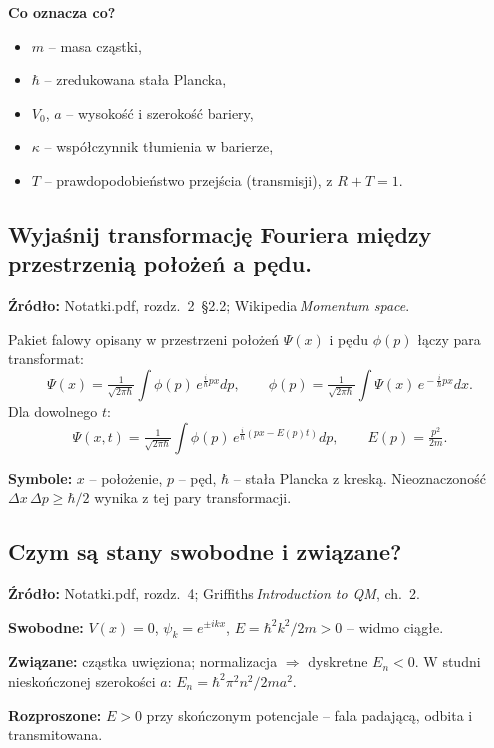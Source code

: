 		\vspace{4pt}
		\textbf{Co oznacza co?}
		\begin{itemize}
			\item $m$ – masa cząstki,
			\item $\hbar$ – zredukowana stała Plancka,
			\item $V_0$, $a$ – wysokość i szerokość bariery,
			\item $\kappa$ – współczynnik tłumienia w barierze,
			\item $T$ – prawdopodobieństwo przejścia (transmisji), z $R+T=1$.
		\end{itemize}

\subsection{Wyjaśnij transformację Fouriera między przestrzenią położeń a pędu.}

\textbf{Źródło:} Notatki.pdf, rozdz.~2~\S2.2; Wikipedia\,\emph{Momentum space}.
		
		Pakiet falowy opisany w przestrzeni położeń $\Psi(x)$ i pędu $\phi(p)$ łączy
		para transformat:
		\[
		\boxed{\Psi(x)=\tfrac{1}{\sqrt{2\pi\hbar}}\!\int\!\phi(p)\,e^{\tfrac{i}{\hbar}px}dp},\qquad
		\boxed{\phi(p)=\tfrac{1}{\sqrt{2\pi\hbar}}\!\int\!\Psi(x)\,e^{\! -\tfrac{i}{\hbar}px}dx}.
		\]
		Dla dowolnego $t$:
		\[
		\Psi(x,t)=\tfrac{1}{\sqrt{2\pi\hbar}}\!\int\!\phi(p)\,e^{\tfrac{i}{\hbar}(px-E(p)t)}dp,\qquad E(p)=\tfrac{p^{2}}{2m}.
		\]
		
		\textbf{Symbole:} $x$ – położenie, $p$ – pęd, $\hbar$ – stała Plancka z kreską.
		Nieoznaczoność $\Delta x\,\Delta p \ge \hbar/2$ wynika z tej pary transformacji.

\subsection{Czym są stany swobodne i związane?}

\textbf{Źródło:} Notatki.pdf, rozdz.~4; Griffiths\,\emph{Introduction to QM}, ch.~2.
		
		\textbf{Swobodne:} $V(x)=0$, $\psi_k=e^{\pm ikx}$, $E=\hbar^{2}k^{2}/2m>0$ – widmo ciągłe.
		
		\textbf{Związane:} cząstka uwięziona; normalizacja $\Rightarrow$ dyskretne $E_n<0$.
		W studni nieskończonej szerokości $a$: $E_n=\hbar^{2}\pi^{2}n^{2}/2ma^{2}$.
		
		\textbf{Rozproszone:} $E>0$ przy skończonym potencjale – fala padającą, odbita i transmitowana.
		
